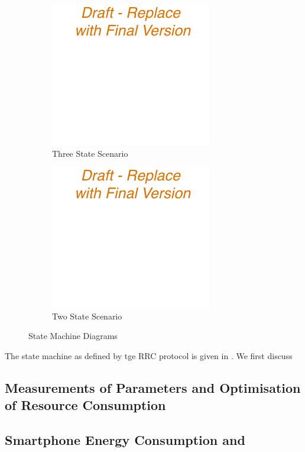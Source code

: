 \begin{figure}
	\begin{subfigure}[b]{.5\textwidth}
	\centering
	\includegraphics{network/background/figures//three_states}
	\caption{Three State Scenario}\label{fig:network:background:rrc_state_machines:three_states}
	\end{subfigure}%
	\begin{subfigure}[b]{.5\textwidth}
	\centering
	\includegraphics{network/background/figures//two_states}
	\caption{Two State Scenario}\label{fig:network:background:rrc_state_machines:two_states}
	\end{subfigure}
	\caption{ State Machine Diagrams}\label{fig:network:background:rrc_state_machines}
\end{figure}

The state machine as defined by tge \gls{RRC} protocol is given in .
We first discuss 

\subsection{Measurements of  Parameters and Optimisation of Resource Consumption}\label{sec:network:background:measurement_optimisation}

\subsection{Smartphone Energy Consumption and }\label{sec:network:background:energy_consumption_qoe}
